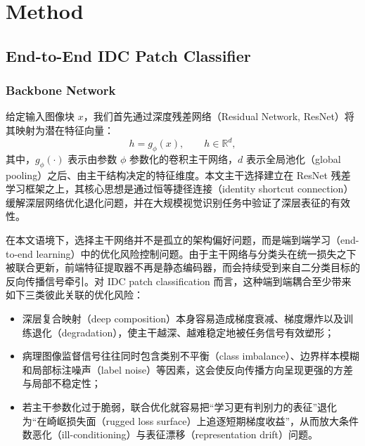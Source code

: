 ﻿\section{Method}
\label{sec:method}

\subsection{End-to-End IDC Patch Classifier}
\label{subsec:end_to_end_classifier}

\subsubsection{Backbone Network}

给定输入图像块 $x$，我们首先通过深度残差网络（Residual Network, ResNet）将其映射为潜在特征向量：
\begin{equation}
    h = g_{\phi}(x), \qquad h \in \mathbb{R}^{d},
\end{equation}
其中，$g_{\phi}(\cdot)$ 表示由参数 $\phi$ 参数化的卷积主干网络，$d$ 表示全局池化（global pooling）之后、由主干结构决定的特征维度。本文主干选择建立在 ResNet 残差学习框架之上，其核心思想是通过恒等捷径连接（identity shortcut connection）缓解深层网络优化退化问题，并在大规模视觉识别任务中验证了深层表征的有效性\cite{He2016ResNet}。

在本文语境下，选择主干网络并不是孤立的架构偏好问题，而是端到端学习（end-to-end learning）中的优化风险控制问题。由于主干网络与分类头在统一损失之下被联合更新，前端特征提取器不再是静态编码器，而会持续受到来自二分类目标的反向传播信号牵引。对 IDC patch classification 而言，这种端到端耦合至少带来如下三类彼此关联的优化风险：
\begin{itemize}
    \item 深层复合映射（deep composition）本身容易造成梯度衰减、梯度爆炸以及训练退化（degradation），使主干越深、越难稳定地被任务信号有效塑形；
    \item 病理图像监督信号往往同时包含类别不平衡（class imbalance）、边界样本模糊和局部标注噪声（label noise）等因素，这会使反向传播方向呈现更强的方差与局部不稳定性；
    \item 若主干参数化过于脆弱，联合优化就容易把“学习更有判别力的表征”退化为“在崎岖损失面（rugged loss surface）上追逐短期梯度收益”，从而放大条件数恶化（ill-conditioning）与表征漂移（representation drift）问题。
\end{itemize}

